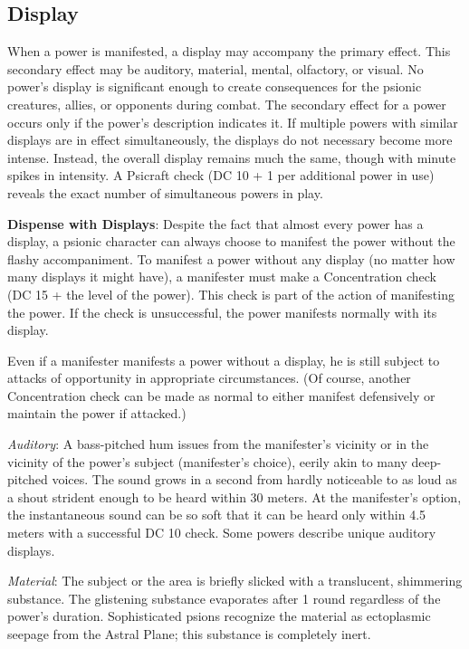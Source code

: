 \subsection{Display}
When a power is manifested, a display may accompany the primary effect. This secondary effect may be auditory, material, mental, olfactory, or visual. No power's display is significant enough to create consequences for the psionic creatures, allies, or opponents during combat. The secondary effect for a power occurs only if the power's description indicates it. If multiple powers with similar displays are in effect simultaneously, the displays do not necessary become more intense. Instead, the overall display remains much the same, though with minute spikes in intensity. A Psicraft check (DC 10 + 1 per additional power in use) reveals the exact number of simultaneous powers in play.

\textbf{Dispense with Displays}: Despite the fact that almost every power has a display, a psionic character can always choose to manifest the power without the flashy accompaniment. To manifest a power without any display (no matter how many displays it might have), a manifester must make a Concentration check (DC 15 + the level of the power). This check is part of the action of manifesting the power. If the check is unsuccessful, the power manifests normally with its display.

Even if a manifester manifests a power without a display, he is still subject to attacks of opportunity in appropriate circumstances. (Of course, another Concentration check can be made as normal to either manifest defensively or maintain the power if attacked.)

\textit{Auditory}: A bass-pitched hum issues from the manifester's vicinity or in the vicinity of the power's subject (manifester's choice), eerily akin to many deep-pitched voices. The sound grows in a second from hardly noticeable to as loud as a shout strident enough to be heard within 30 meters. At the manifester's option, the instantaneous sound can be so soft that it can be heard only within 4.5 meters with a successful DC 10  check. Some powers describe unique auditory displays.

\textit{Material}: The subject or the area is briefly slicked with a translucent, shimmering substance. The glistening substance evaporates after 1 round regardless of the power's duration. Sophisticated psions recognize the material as ectoplasmic seepage from the Astral Plane; this substance is completely inert.

